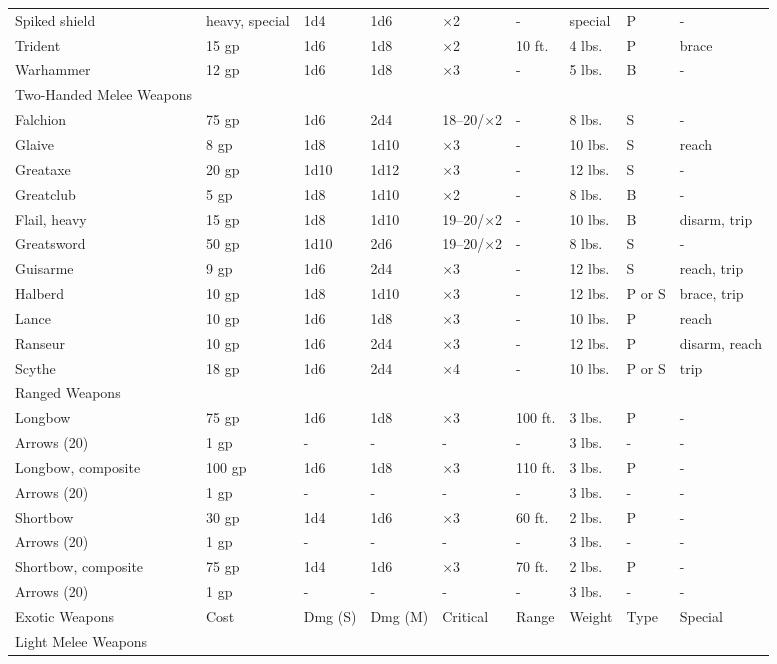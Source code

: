 \begin{table}[]
\begin{tabular}{lllllllll}
 Spiked shield & heavy, special & 1d4 & 1d6 & ×2 & - & special & P & - \\
 Trident & 15 gp & 1d6 & 1d8 & ×2 & 10 ft. & 4 lbs. & P & brace \\
 Warhammer & 12 gp & 1d6 & 1d8 & ×3 & - & 5 lbs. & B & - \\
 Two-Handed Melee Weapons \\
 Falchion & 75 gp & 1d6 & 2d4 & 18–20/×2 & - & 8 lbs. & S & - \\
 Glaive & 8 gp & 1d8 & 1d10 & ×3 & - & 10 lbs. & S & reach \\
 Greataxe & 20 gp & 1d10 & 1d12 & ×3 & - & 12 lbs. & S & - \\
 Greatclub & 5 gp & 1d8 & 1d10 & ×2 & - & 8 lbs. & B & - \\
 Flail, heavy & 15 gp & 1d8 & 1d10 & 19–20/×2 & - & 10 lbs. & B & disarm, trip \\
 Greatsword & 50 gp & 1d10 & 2d6 & 19–20/×2 & - & 8 lbs. & S & - \\
 Guisarme & 9 gp & 1d6  & 2d4 & ×3 & - & 12 lbs. & S & reach, trip \\
 Halberd & 10 gp & 1d8 & 1d10 & ×3 & - & 12 lbs. & P or S & brace, trip \\
 Lance & 10 gp & 1d6 & 1d8 & ×3 & - & 10 lbs. & P & reach \\
 Ranseur & 10 gp & 1d6 & 2d4 & ×3 & - & 12 lbs. & P & disarm, reach \\
 Scythe & 18 gp & 1d6 & 2d4 & ×4 & - & 10 lbs. & P or S & trip \\
 Ranged Weapons \\
 Longbow & 75 gp & 1d6 & 1d8 & ×3 & 100 ft. & 3 lbs. & P & - \\
 Arrows (20) & 1 gp & - & - & - & - & 3 lbs. & - & - \\
 Longbow, composite & 100 gp & 1d6 & 1d8 & ×3 & 110 ft. & 3 lbs. & P & - \\
 Arrows (20) & 1 gp & - & - & - & - & 3 lbs. & - & - \\
 Shortbow & 30 gp & 1d4 & 1d6 & ×3 & 60 ft. & 2 lbs. & P & - \\
 Arrows (20) & 1 gp & - & - & - & - & 3 lbs. & - & - \\
 Shortbow, composite & 75 gp & 1d4 & 1d6 & ×3 & 70 ft. & 2 lbs. & P & - \\
 Arrows (20) & 1 gp & - & - & - & - & 3 lbs. & - & -\\
Exotic Weapons & Cost & Dmg (S) & Dmg (M) & Critical & Range & Weight &  Type & Special\\
Light Melee Weapons \\

\end{tabular}
\end{table}
